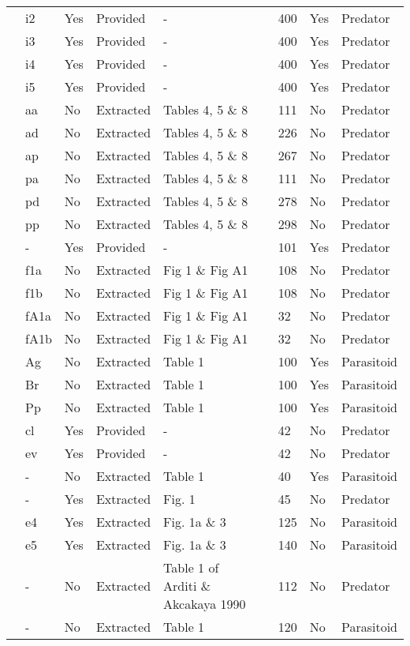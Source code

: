 \begin{longtable}{lllllllll}
\citet{Elliott:2005aa}&i2&Yes&Provided&-&&400&Yes&Predator\tabularnewline
\citet{Elliott:2005aa}&i3&Yes&Provided&-&&400&Yes&Predator\tabularnewline
\citet{Elliott:2005aa}&i4&Yes&Provided&-&&400&Yes&Predator\tabularnewline
\citet{Elliott:2005aa}&i5&Yes&Provided&-&&400&Yes&Predator\tabularnewline
\citet{Eveleigh:1982aa}&aa&No&Extracted&Tables 4, 5 \& 8&\citet{Novak:2020aa}&111&No&Predator\tabularnewline
\citet{Eveleigh:1982aa}&ad&No&Extracted&Tables 4, 5 \& 8&\citet{Novak:2020aa}&226&No&Predator\tabularnewline
\citet{Eveleigh:1982aa}&ap&No&Extracted&Tables 4, 5 \& 8&\citet{Novak:2020aa}&267&No&Predator\tabularnewline
\citet{Eveleigh:1982aa}&pa&No&Extracted&Tables 4, 5 \& 8&\citet{Novak:2020aa}&111&No&Predator\tabularnewline
\citet{Eveleigh:1982aa}&pd&No&Extracted&Tables 4, 5 \& 8&\citet{Novak:2020aa}&278&No&Predator\tabularnewline
\citet{Eveleigh:1982aa}&pp&No&Extracted&Tables 4, 5 \& 8&\citet{Novak:2020aa}&298&No&Predator\tabularnewline
\citet{Fussmann:2005aa}&-&Yes&Provided&-&\citet{Fussmann:2020aa}&101&Yes&Predator\tabularnewline
\citet{Griffen:2007aa}&f1a&No&Extracted&Fig 1 \& Fig A1&\citet{Novak:2020aa}&108&No&Predator\tabularnewline
\citet{Griffen:2007aa}&f1b&No&Extracted&Fig 1 \& Fig A1&\citet{Novak:2020aa}&108&No&Predator\tabularnewline
\citet{Griffen:2007aa}&fA1a&No&Extracted&Fig 1 \& Fig A1&\citet{Novak:2020aa}&32&No&Predator\tabularnewline
\citet{Griffen:2007aa}&fA1b&No&Extracted&Fig 1 \& Fig A1&\citet{Novak:2020aa}&32&No&Predator\tabularnewline
\citet{Hassan:1976aa}&Ag&No&Extracted&Table 1&\citet{Novak:2020aa}&100&Yes&Parasitoid\tabularnewline
\citet{Hassan:1976aa}&Br&No&Extracted&Table 1&\citet{Novak:2020aa}&100&Yes&Parasitoid\tabularnewline
\citet{Hassan:1976aa}&Pp&No&Extracted&Table 1&\citet{Novak:2020aa}&100&Yes&Parasitoid\tabularnewline
\citet{Hossie:2016aa}&cl&Yes&Provided&-&\citet{Hossie:2020aa}&42&No&Predator\tabularnewline
\citet{Hossie:2016aa}&ev&Yes&Provided&-&\citet{Hossie:2020aa}&42&No&Predator\tabularnewline
\citet{Huffaker:1982aa}&-&No&Extracted&Table 1&\citet{Novak:2020aa}&40&Yes&Parasitoid\tabularnewline
\citet{Johnson:2006aa}&-&Yes&Extracted&Fig. 1&\citet{Novak:2020aa}&45&No&Predator\tabularnewline
\citet{Jones:1988aa, Jones:1986aa}&e4&Yes&Extracted&Fig. 1a \& 3&\citet{Novak:2020aa}&125&No&Parasitoid\tabularnewline
\citet{Jones:1988aa, Jones:1986aa}&e5&Yes&Extracted&Fig. 1a \& 3&\citet{Novak:2020aa}&140&No&Parasitoid\tabularnewline
\citet{Katz:1985ai}&-&No&Extracted&Table 1 of Arditi \& Akcakaya 1990&\citet{Arditi:1990sp}&112&No&Predator\tabularnewline
\citet{Kfir:1983aa}&-&No&Extracted&Table 1&\citet{Novak:2020aa}&120&No&Parasitoid\tabularnewline

\end{longtable}
